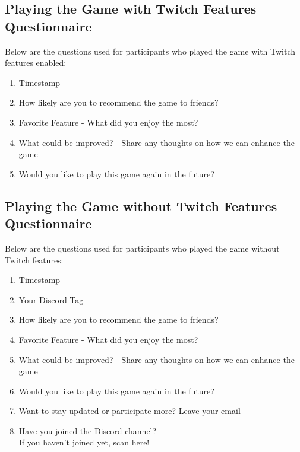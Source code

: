 \documentclass[conference]{IEEEtran}
\begin{document}
\subsection{Playing the Game with Twitch Features Questionnaire}
Below are the questions used for participants who played the game with Twitch features enabled:
\begin{enumerate}
    \item Timestamp
    \item How likely are you to recommend the game to friends?
    \item Favorite Feature - What did you enjoy the most?
    \item What could be improved? - Share any thoughts on how we can enhance the game
    \item Would you like to play this game again in the future?
\end{enumerate}

\subsection{Playing the Game without Twitch Features Questionnaire}
Below are the questions used for participants who played the game without Twitch features:
\begin{enumerate}
    \item Timestamp
    \item Your Discord Tag
    \item How likely are you to recommend the game to friends?
    \item Favorite Feature - What did you enjoy the most?
    \item What could be improved? - Share any thoughts on how we can enhance the game
    \item Would you like to play this game again in the future?
    \item Want to stay updated or participate more? Leave your email
    \item Have you joined the Discord channel?\\
    If you haven't joined yet, scan here!
\end{enumerate}
\end{document}
